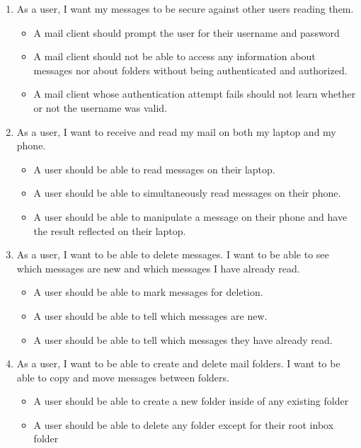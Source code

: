 \documentclass[a4paper,12pt]{article}
\begin{document}
\begin{enumerate}

\item As a user, I want my messages to be secure against other users reading them.

  \begin{itemize}
  \item A mail client should prompt the user for their username and password
  \item A mail client should not be able to access any information about messages nor about folders without being authenticated and authorized.
  \item A mail client whose authentication attempt fails should not learn whether or not the username was valid.
  \end{itemize}

\item As a user, I want to receive and read my mail on both my laptop and my phone.

  \begin{itemize}
  \item A user should be able to read messages on their laptop.
  \item A user should be able to simultaneously read messages on their phone.
  \item A user should be able to manipulate a message on their phone and have the result reflected on their laptop.
  \end{itemize}

\item As a user, I want to be able to delete messages. I want to be able to see which messages are new and which messages I have already read.

  \begin{itemize}
  \item A user should be able to mark messages for deletion.
  \item A user should be able to tell which messages are new.
  \item A user should be able to tell which messages they have already read.
  \end{itemize}

\item As a user, I want to be able to create and delete mail folders. I want to be able to copy and move messages between folders.

  \begin{itemize}
  \item A user should be able to create a new folder inside of any existing folder
  \item A user should be able to delete any folder except for their root inbox folder
  \end{itemize}


\end{enumerate}
\end{document}
